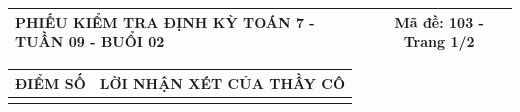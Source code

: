 \documentclass[12pt,a4paper]{article}
\begin{document}
\newpage
\noindent
\begin{tabularx}{\linewidth}{|X|c|}
\hline
\textbf{PHIẾU KIỂM TRA ĐỊNH KỲ TOÁN 7 - TUẦN 09 - BUỔI 02} & \textbf{Mã đề: 103 - Trang 1/2} \\
\hline
\end{tabularx}

\vspace{1.2mm}

\noindent
\begin{tabularx}{\linewidth}{|p{3.2cm}|X|}
\hline
\centering\textbf{ĐIỂM SỐ} & \centering\textbf{LỜI NHẬN XÉT CỦA THẦY CÔ} \tabularnewline
\hline
\rule{0pt}{1.8cm} & \tabularnewline
\hline
\end{tabularx}
\end{document}
